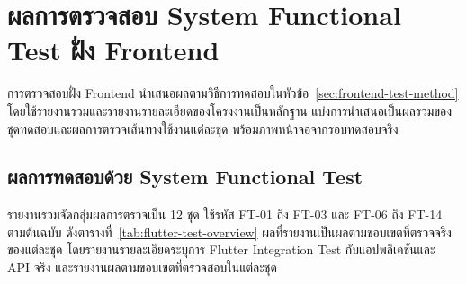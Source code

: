 \section{ผลการตรวจสอบ System Functional Test ฝั่ง Frontend}
\label{sec:frontend-test-results}

การตรวจสอบฝั่ง Frontend นำเสนอผลตามวิธีการทดสอบในหัวข้อ~\ref{sec:frontend-test-method} โดยใช้รายงานรวมและรายงานรายละเอียดของโครงงานเป็นหลักฐาน แบ่งการนำเสนอเป็นผลรวมของชุดทดสอบและผลการตรวจเส้นทางใช้งานแต่ละชุด พร้อมภาพหน้าจอจากรอบทดสอบจริง

\subsection{ผลการทดสอบด้วย System Functional Test}

รายงานรวมจัดกลุ่มผลการตรวจเป็น 12 ชุด ใช้รหัส FT-01 ถึง FT-03 และ FT-06 ถึง FT-14 ตามต้นฉบับ ดังตารางที่~\ref{tab:flutter-test-overview} ผลที่รายงานเป็นผลตามขอบเขตที่ตรวจจริงของแต่ละชุด โดยรายงานรายละเอียดระบุการ Flutter Integration Test กับแอปพลิเคชันและ API จริง และรายงานผลตามขอบเขตที่ตรวจสอบในแต่ละชุด

